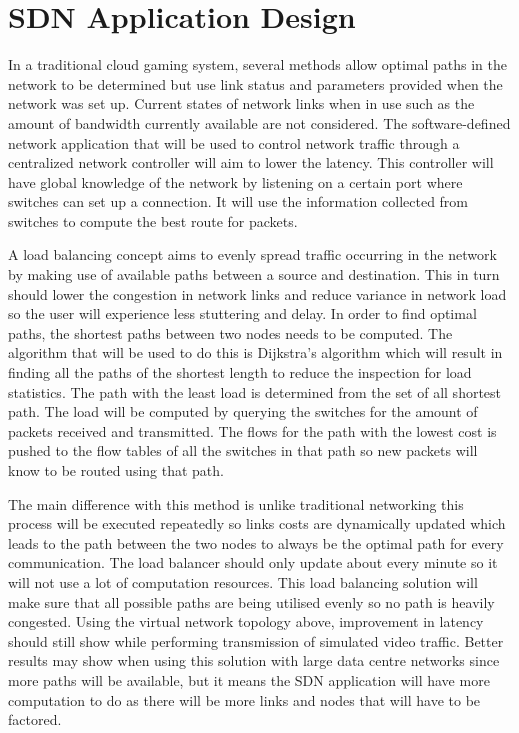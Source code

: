 \section{SDN Application Design}
In a traditional cloud gaming system, several methods allow optimal paths in the network to be determined but use link status and parameters provided when the network was set up. Current states of network links when in use such as the amount of bandwidth currently available are not considered. The software-defined network application that will be used to control network traffic through a centralized network controller will aim to lower the latency. This controller will have global knowledge of the network by listening on a certain port where switches can set up a connection. It will use the information collected from switches to compute the best route for packets.
\newline
\par
A load balancing concept aims to evenly spread traffic occurring in the network by making use of available paths between a source and destination. This in turn should lower the congestion in network links and reduce variance in network load so the user will experience less stuttering and delay. In order to find optimal paths, the shortest paths between two nodes needs to be computed. The algorithm that will be used to do this is Dijkstra's algorithm which will result in finding all the paths of the shortest length to reduce the inspection for load statistics. The path with the least load is determined from the set of all shortest path. The load will be computed by querying the switches for the amount of packets received and transmitted. The flows for the path with the lowest cost is pushed to the flow tables of all the switches in that path so new packets will know to be routed using that path.
\newline
\par
The main difference with this method is unlike traditional networking this process will be executed repeatedly so links costs are dynamically updated which leads to the path between the two nodes to always be the optimal path for every communication. The load balancer should only update about every minute so it will not use a lot of computation resources. This load balancing solution will make sure that all possible paths are being utilised evenly so no path is heavily congested. Using the virtual network topology above, improvement in latency should still show while performing transmission of simulated video traffic. Better results may show when using this solution with large data centre networks since more paths will be available, but it means the SDN application will have more computation to do as there will be more links and nodes that will have to be factored.
